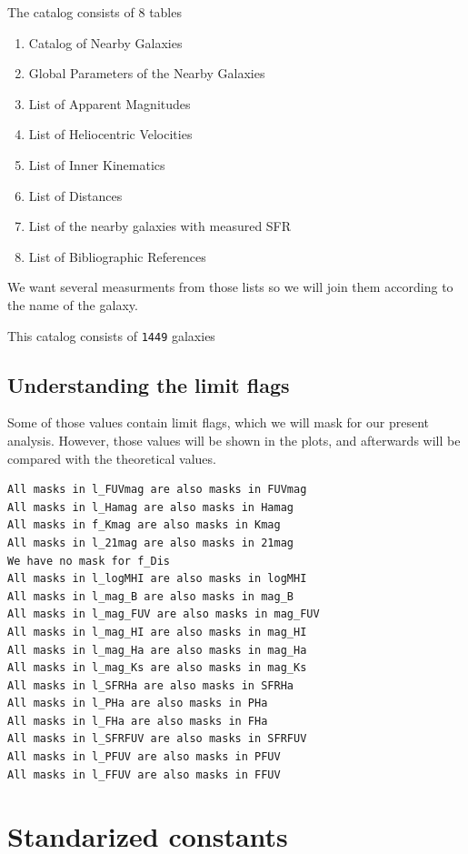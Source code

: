 \documentclass[a4paper]{article}
\begin{document}
The catalog consists of 8 tables

\begin{enumerate}
\item Catalog of Nearby Galaxies
\item Global Parameters of the Nearby Galaxies
\item List of Apparent Magnitudes
\item List of Heliocentric Velocities
\item List of Inner Kinematics
\item List of Distances
\item List of the nearby galaxies with measured SFR
\item List of Bibliographic References
\end{enumerate}

We want several measurments from those lists so we will join them according to the name of the galaxy.

This catalog consists of \texttt{1449} galaxies

\subsection{Understanding the limit flags}
\label{sec:org3ad49c4}

Some of those values contain limit flags, which we will mask for our present analysis. However, those values will be shown in the plots, and afterwards will be compared with the theoretical values.

\begin{verbatim}
All masks in l_FUVmag are also masks in FUVmag
All masks in l_Hamag are also masks in Hamag
All masks in f_Kmag are also masks in Kmag
All masks in l_21mag are also masks in 21mag
We have no mask for f_Dis
All masks in l_logMHI are also masks in logMHI
All masks in l_mag_B are also masks in mag_B
All masks in l_mag_FUV are also masks in mag_FUV
All masks in l_mag_HI are also masks in mag_HI
All masks in l_mag_Ha are also masks in mag_Ha
All masks in l_mag_Ks are also masks in mag_Ks
All masks in l_SFRHa are also masks in SFRHa
All masks in l_PHa are also masks in PHa
All masks in l_FHa are also masks in FHa
All masks in l_SFRFUV are also masks in SFRFUV
All masks in l_PFUV are also masks in PFUV
All masks in l_FFUV are also masks in FFUV
\end{verbatim}




\section{Standarized constants}
\label{sec:org7f042ce}
\end{document}
